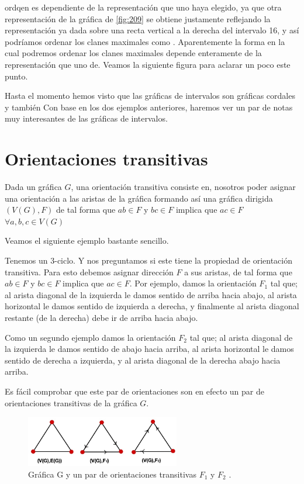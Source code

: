 ordqen es dependiente de la representación que uno haya elegido, ya que otra representación de la gráfica de \cref{fig:209} se obtiene justamente reflejando la representación ya dada sobre una recta vertical a la derecha del intervalo 16, y así podríamos ordenar los clanes maximales como . Aparentemente la forma en la cual podremos ordenar los clanes maximales depende enteramente de la representación que uno de. Veamos la siguiente figura para aclarar un poco este punto.

Hasta el momento hemos visto que las gráficas de intervalos son gráficas cordales y también 
Con base en los dos ejemplos anteriores, haremos ver un par de notas muy interesantes de las gráficas de intervalos.


\section{Orientaciones transitivas}

Dada un gráfica $G$, una orientación transitiva consiste en, nosotros poder asignar una orientación a las aristas de la gráfica formando así una gráfica dirigida $(V(G),F)$ de tal forma que $ab\in F$ y $bc\in F$ implica que $ac\in F$ $\forall a,b,c \in V(G)$

Veamos el siguiente ejemplo bastante sencillo.


    \label{exmpl:205}
    Tenemos un 3-ciclo. Y nos preguntamos si este tiene la propiedad de orientación transitiva. Para esto debemos asignar dirección $F$ a sus aristas, de tal forma que $ab\in F$ y $bc\in F$ implica que $ac\in F$.
    Por ejemplo, damos la orientación $F_1$ tal que; al arista diagonal de la izquierda le damos sentido de arriba hacia abajo, al arista horizontal le damos sentido de izquierda a derecha, y finalmente al arista diagonal restante (de la derecha) debe ir de arriba hacia abajo.
    
    Como un segundo ejemplo damos la orientación $F_2$ tal que; al arista diagonal de la izquierda le damos sentido de abajo hacia arriba, al arista horizontal le damos sentido de derecha a izquierda, y al arista diagonal de la derecha abajo hacia arriba.

    Es fácil comprobar que este par de orientaciones son en efecto un par de orientaciones transitivas de la gráfica $G$.


\begin{figure}[H]
  \centering
  \includegraphics[width=0.6\textwidth]{recursos/capturas/205.jpg}
  \caption{ Gráfica G y un par de orientaciones transitivas $F_1$ y $F_2$ .}
  \label{fig:205}
\end{figure}

